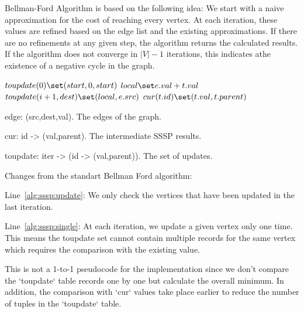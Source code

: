 Bellman-Ford Algorithm \cite{bellman1958routing,ford1956network} is based on the following idea: We start with a naive approximation for the cost of reaching every vertex. At each iteration, these values are refined based on the edge list and the existing approximations. If there are no refinements at any given step, the algorithm returns the calculated results. If the algorithm does not converge in $|V|-1$ iterations, this indicates athe existence of a negative cycle in the graph.


\begin{algorithm} \label{alg:sssp}
\begin{algorithmic}[1]
	\State $toupdate(0) \set (start,0,start)$
		 \label{alg:sssp:update}
		 		\State $local \set e.val + t.val$
		 		 \label{alg:sssp:single}
		 			\State $toupdate(i+1,dest) \set (local,e.src)$
		 		\EndIf
			\EndFor
		\EndFor
		 		\State $cur(t.id) \set (t.val,t.parent)$
		 	\EndIf
		\EndFor
	\EndFor
\end{algorithmic}
\end{algorithm}

\begin{description}
\item edge: (src,dest,val). The edges of the graph.
\item cur: id -> (val,parent). The intermediate SSSP results.
\item toupdate: iter -> (id -> (val,parent)). The set of updates.
\end{description}

Changes from the standart Bellman Ford algorithm:

\begin{description}
\item Line~\ref{alg:sssp:update}: We only check the vertices that have been updated in the last iteration.
\item Line~\ref{alg:sssp:single}: At each iteration, we update a given vertex only one time. This means the toupdate set cannot contain multiple records for the same vertex which requires the comparison with the existing value.
\end{description}

This is not a 1-to-1 pseudocode for the implementation since we don't compare the `toupdate` table records one by one but calculate the overall minimum. In addition, the comparison with `cur` values take place earlier to reduce the number of tuples in the `toupdate` table.

